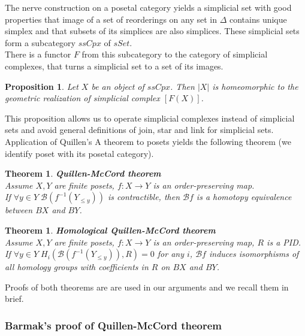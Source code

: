 \documentclass[english,12pt]{article}
\newcounter{stmcounter}[section]
\newcounter{thcounter}
\numberwithin{equation}{section}
\newtheorem{proposition}[stmcounter]{Proposition}
\newtheorem{theorem}[thcounter]{Theorem}
\theoremstyle{definition}
\theoremstyle{remark}
\begin{document}
The nerve construction on a posetal category yields a simplicial set with good properties that image of a set of reorderings on any set in $\Delta$ contains unique simplex and that subsets of its simplices are also simplices. These simplicial sets form a subcategory $ssCpx$ of $sSet$.\\

There is a functor $F$ from this subcategory to the category of simplicial complexes, that turns a simplicial set to a set of its images.\\

\begin{proposition}
  Let $X$ be an object of $ssCpx$. Then $|X|$ is homeomorphic to the geometric realization of simplicial complex $[F(X)]$.
\end{proposition}

This proposition allows us to operate simplicial complexes instead of simplicial sets and avoid general definitions of join, star and link for simplicial sets.\\

Application of Quillen's A theorem to posets yields the following theorem (we identify poset with its posetal category).

\begin{theorem} \textbf{Quillen-McCord theorem}\\
  Assume $X, Y$ are finite posets, $f : X \to Y$ is an order-preserving map.\\
  If $\forall y \in Y\;\mathcal{B}(f^{-1}(Y_{\leqslant y}))$ is contractible, then $\mathcal{B}f$ is a homotopy equivalence between $BX$ and $BY$.\\
\end{theorem}

\begin{theorem} \textbf{Homological Quillen-McCord theorem} {\cite[Corollary 5.5]{Bar11}}\\
  Assume $X, Y$ are finite posets, $f : X \to Y$ is an order-preserving map, $R$ is a PID.\\
  If $\forall y \in Y\;H_i(\mathcal{B}(f^{-1}(Y_{\leqslant y})),R) = 0$ for any $i$, $\mathcal{B}f$ induces isomorphisms of all homology groups with coefficients in $R$ on $BX$ and $BY$.\\
\end{theorem}

Proofs of both theorems are are used in our arguments and we recall them in brief.

\subsubsection{Barmak's proof of Quillen-McCord theorem}
\end{document}

